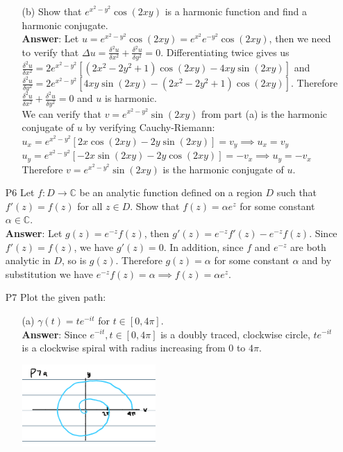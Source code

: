 \documentclass{article}
\begin{document}
\begin{itemize}
\begin{itemize}
                  \item [(b)] Show that $e^{x^2-y^2}\cos(2xy)$ is a harmonic function and find a harmonic conjugate.\\
                        \textbf{Answer}: Let $u=e^{x^2-y^2}\cos(2xy)=e^{x^2}e^{-y^2}\cos(2xy)$, then we need to verify that $\Delta u=\frac{\delta^2 u}{\delta x^2}+\frac{\delta^2 u}{\delta y^2}=0$. Differentiating twice gives us $\frac{\delta^2 u}{\delta x^2}=2e^{x^2-y^2}[(2x^2-2y^2+1)\cos(2xy)-4xy\sin(2xy)]$ and $\frac{\delta^2 u}{\delta y^2}=2e^{x^2-y^2}[4xy\sin(2xy)-(2x^2-2y^2+1)\cos(2xy)]$. Therefore $\frac{\delta^2 u}{\delta x^2}+\frac{\delta^2 u}{\delta y^2}=0$ and $u$ is harmonic.\\
                        We can verify that $v=e^{x^2-y^2}\sin(2xy)$ from part (a) is the harmonic conjugate of $u$ by verifying Cauchy-Riemann:\\
                        $u_x=e^{x^2-y^2}[2x\cos(2xy)-2y\sin(2xy)]=v_y\implies u_x=v_y$\\
                        $u_y=e^{x^2-y^2}[-2x\sin(2xy)-2y\cos(2xy)]=-v_x\implies u_y=-v_x$\\
                        Therefore $v=e^{x^2-y^2}\sin(2xy)$ is the harmonic conjugate of $u$.
            \end{itemize}
      \item [P6] Let $f:D\rightarrow\mathbb{C}$ be an analytic function defined on a region $D$ such that $f'(z)=f(z)$ for all $z\in D$. Show that $f(z)=\alpha e^z$ for some constant $\alpha\in\mathbb{C}$.\\
            \textbf{Answer}: Let $g(z)=e^{-z}f(z)$, then $g'(z)=e^{-z}f'(z)-e^{-z}f(z)$. Since $f'(z)=f(z)$, we have $g'(z)=0$. In addition, since $f$ and $e^{-z}$ are both analytic in $D$, so is $g(z)$. Therefore $g(z)=\alpha$ for some constant $\alpha$ and by substitution we have $e^{-z}f(z)=\alpha\implies f(z)=\alpha e^z$.
      \item [P7] Plot the given path:
            \begin{itemize}
                  \item [(a)] $\gamma(t)=te^{-it}$ for $t\in[0,4\pi]$.\\\textbf{Answer}: Since $e^{-it},t\in[0,4\pi]$ is a doubly traced, clockwise circle, $te^{-it}$ is a clockwise spiral with radius increasing from $0$ to $4\pi$.
                        \begin{center}
                              \includegraphics[width=2in]{P7a.png}

\end{center}
\end{itemize}
\end{itemize}
\end{document}
